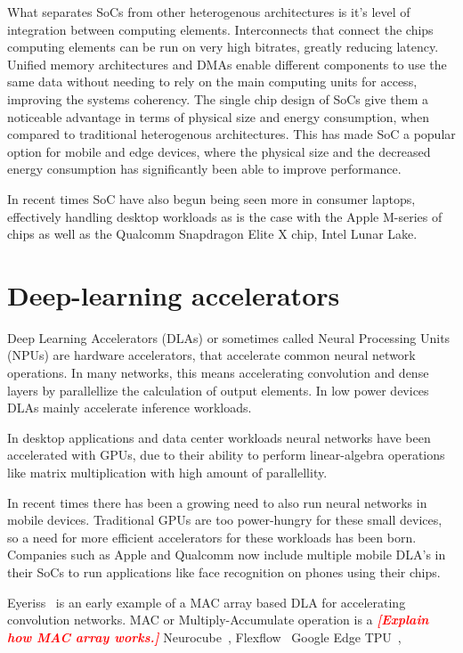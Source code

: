 \documentclass[12pt,a4paper,english
]{tunithesis}
\newcommand{\fixthis}[1]{\textbf{\textit{\textcolor{red}{[#1]}}}}
\begin{document}
What separates SoCs from other heterogenous architectures is it's level of integration between computing elements. Interconnects that connect the chips computing elements can be run on very high bitrates, greatly reducing latency. Unified memory architectures and DMAs enable different components to use the same data without needing to rely on the main computing units for access, improving the systems coherency. The single chip design of SoCs give them a noticeable advantage in terms of physical size and energy consumption, when compared to traditional heterogenous architectures. This has made SoC a popular option for mobile and edge devices, where the physical size and the decreased energy consumption has significantly been able to improve performance.

In recent times SoC have also begun being seen more in consumer laptops, effectively handling desktop workloads as is the case with the Apple M-series of chips as well as the Qualcomm Snapdragon Elite X chip, Intel Lunar Lake.

\cite{di_natale_moving_2010}

\section{Deep-learning accelerators}
\label{sec:dlas}
Deep Learning Accelerators (DLAs) or sometimes called Neural Processing Units (NPUs) are hardware accelerators, that accelerate common neural network operations. In many networks, this means accelerating convolution and dense layers by parallellize the calculation of output elements.
In low power devices DLAs mainly accelerate inference workloads.

In desktop applications and data center workloads neural networks have been accelerated with GPUs, due to their ability to perform linear-algebra operations like matrix multiplication with high amount of parallellity.

In recent times there has been a growing need to also run neural networks in mobile devices. Traditional GPUs are too power-hungry for these small devices, so a need for more efficient accelerators for these workloads has been born. Companies such as Apple and Qualcomm now include multiple mobile DLA's in their SoCs to run applications like face recognition on phones using their chips.


Eyeriss~\cite{chen_eyeriss_2017} is an early example of a MAC array based DLA for accelerating convolution networks. MAC or Multiply-Accumulate operation is a \fixthis{Explain how MAC array works.}
Neurocube~\cite{noauthor_neurocube_nodate}, Flexflow~\cite{lu_flexflow_2017} Google Edge TPU~\cite{EdgeTPU},
\end{document}
